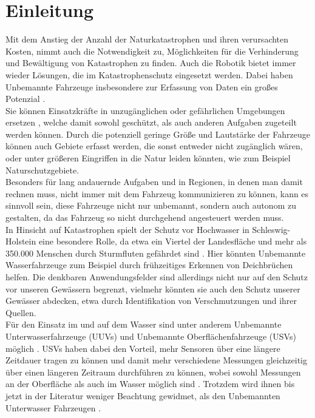 \documentclass[conference]{IEEEtran}
\begin{document}
\section{Einleitung}
Mit dem Anstieg der Anzahl der Naturkatastrophen und ihren verursachten Kosten\cite{b1}, nimmt auch die Notwendigkeit zu,  Möglichkeiten für die Verhinderung und Bewältigung von Katastrophen zu finden. Auch die Robotik bietet immer wieder Lösungen, die im Katastrophenschutz eingesetzt werden. Dabei haben Unbemannte Fahrzeuge insbesondere zur Erfassung von Daten ein großes Potenzial \cite{b2}.\\
Sie können Einsatzkräfte in unzugänglichen oder gefährlichen Umgebungen ersetzen \cite{b3}, welche damit sowohl geschützt, als auch anderen Aufgaben zugeteilt werden können.  Durch die potenziell geringe Größe und Lautstärke der Fahrzeuge können auch Gebiete erfasst werden, die sonst entweder nicht zugänglich wären, oder unter größeren Eingriffen in die Natur leiden könnten, wie zum Beispiel Naturschutzgebiete.\\
Besonders für lang andauernde Aufgaben und in Regionen, in denen man damit rechnen muss, nicht immer mit dem Fahrzeug kommunizieren zu können, kann es sinnvoll sein, diese Fahrzeuge nicht nur unbemannt, sondern auch autonom zu gestalten, da das Fahrzeug so nicht durchgehend angesteuert werden muss.\\
In Hinsicht auf Katastrophen spielt der Schutz vor Hochwasser in Schleswig-Holstein eine besondere Rolle, da etwa ein Viertel der Landesfläche und mehr als 350.000 Menschen durch Sturmfluten gefährdet sind \cite{b4}. Hier könnten Unbemannte Wasserfahrzeuge zum Beispiel durch frühzeitiges Erkennen von Deichbrüchen helfen. Die denkbaren Anwendungsfelder sind allerdings nicht nur auf den Schutz vor unseren Gewässern begrenzt, vielmehr könnten sie auch den Schutz unserer Gewässer abdecken, etwa durch Identifikation von Verschmutzungen und ihrer Quellen.\\
Für den Einsatz im und auf dem Wasser sind unter anderem Unbemannte Unterwasserfahrzeuge (UUVs) und Unbemannte Oberflächenfahrzeuge (USVs) möglich \cite{b2}. USVs haben dabei den Vorteil, mehr Sensoren über eine längere Zeitdauer tragen zu können und damit mehr verschiedene Messungen gleichzeitig über einen längeren Zeitraum durchführen zu können, wobei sowohl Messungen an der Oberfläche als auch im Wasser möglich sind \cite{b5}. Trotzdem wird ihnen bis jetzt in der Literatur weniger Beachtung gewidmet, als den Unbemannten Unterwasser Fahrzeugen \cite{b2}.\\
\end{document}
